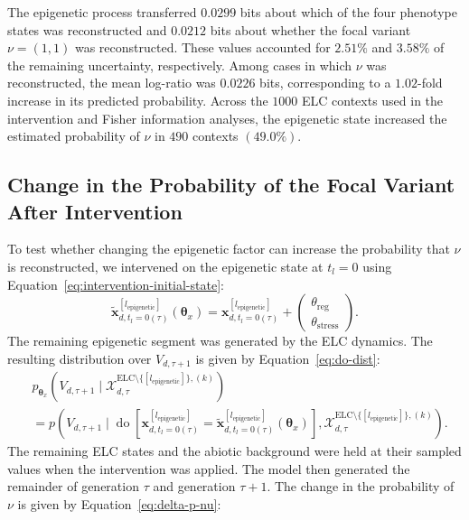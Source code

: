 \documentclass[11pt]{article}
\newcommand{\ELC}{\mathrm{ELC}}
\begin{document}
The epigenetic process transferred $0.0299$ bits about which of the four phenotype states was reconstructed and $0.0212$ bits about whether the focal variant $\nu=(1,1)$ was reconstructed. These values accounted for $2.51\%$ and $3.58\%$ of the remaining uncertainty, respectively. Among cases in which $\nu$ was reconstructed, the mean log-ratio was $0.0226$ bits, corresponding to a $1.02$-fold increase in its predicted probability. Across the $1000$ ELC contexts used in the intervention and Fisher information analyses, the epigenetic state increased the estimated probability of $\nu$ in $490$ contexts $(49.0\%)$.

\subsection{Change in the Probability of the Focal Variant After Intervention}
To test whether changing the epigenetic factor can increase the probability that $\nu$ is reconstructed, we intervened on the epigenetic state at $t_l=0$ using Equation~\ref{eq:intervention-initial-state}:
\begin{equation}
\widetilde{\mathbf{x}}^{[l_{\mathrm{epigenetic}}]}_{d,t_l=0(\tau)}(\boldsymbol{\theta}_x)
=
\mathbf{x}^{[l_{\mathrm{epigenetic}}]}_{d,t_l=0(\tau)}
+
\begin{pmatrix}
\theta_{\mathrm{reg}}\\
\theta_{\mathrm{stress}}
\end{pmatrix}.
\label{eq:intervention-initial-state}
\end{equation}
The remaining epigenetic segment was generated by the ELC dynamics. The resulting distribution over $V_{d,\tau+1}$ is given by Equation~\ref{eq:do-dist}:
\begin{equation}
\begin{aligned}
&p_{\boldsymbol{\theta}_x}\left(
V_{d,\tau+1}
\mid
\mathcal{X}^{\ELC\setminus\{[l_{\mathrm{epigenetic}}]\},(k)}_{d,\tau}
\right)
\\
&=
p\left(
V_{d,\tau+1}
\mid
\operatorname{do}\left[
\mathbf{x}^{[l_{\mathrm{epigenetic}}]}_{d,t_l=0(\tau)}
=
\widetilde{\mathbf{x}}^{[l_{\mathrm{epigenetic}}]}_{d,t_l=0(\tau)}(\boldsymbol{\theta}_x)
\right],
\mathcal{X}^{\ELC\setminus\{[l_{\mathrm{epigenetic}}]\},(k)}_{d,\tau}
\right).
\end{aligned}
\label{eq:do-dist}
\end{equation}
The remaining ELC states and the abiotic background were held at their sampled values when the intervention was applied. The model then generated the remainder of generation $\tau$ and generation $\tau+1$. The change in the probability of $\nu$ is given by Equation~\ref{eq:delta-p-nu}:
\end{document}
